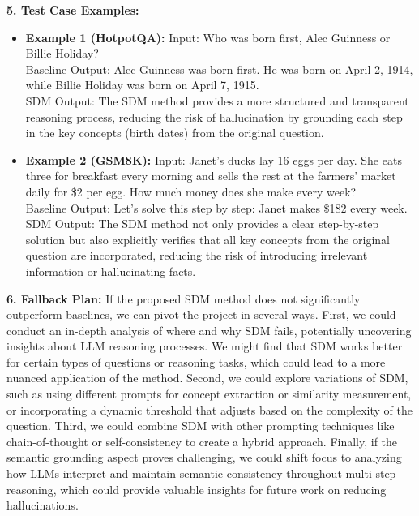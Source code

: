 \newpage

\begin{tcolorbox}[colback=blue!5!white,colframe=blue!75!black,title=\textbf{Semantic Divergence Minimization: Reducing Hallucinations in Large Language Models
through Iterative Concept Grounding (Part 3)}]
\small{
\textbf{5. Test Case Examples:}
\begin{itemize}
    \item \textbf{Example 1 (HotpotQA):} Input: Who was born first, Alec Guinness or Billie Holiday? \\
    Baseline Output: Alec Guinness was born first. He was born on April 2, 1914, while Billie Holiday was born on April 7, 1915. \\
    SDM Output: The SDM method provides a more structured and transparent reasoning process, reducing the risk of hallucination by grounding each step in the key concepts (birth dates) from the original question.

    \item \textbf{Example 2 (GSM8K):} Input: Janet's ducks lay 16 eggs per day. She eats three for breakfast every morning and sells the rest at the farmers' market daily for \$2 per egg. How much money does she make every week? \\
    Baseline Output: Let's solve this step by step: Janet makes \$182 every week. \\
    SDM Output: The SDM method not only provides a clear step-by-step solution but also explicitly verifies that all key concepts from the original question are incorporated, reducing the risk of introducing irrelevant information or hallucinating facts.
\end{itemize}

\textbf{6. Fallback Plan:} If the proposed SDM method does not significantly outperform baselines, we can pivot the project in several ways. First, we could conduct an in-depth analysis of where and why SDM fails, potentially uncovering insights about LLM reasoning processes. We might find that SDM works better for certain types of questions or reasoning tasks, which could lead to a more nuanced application of the method. Second, we could explore variations of SDM, such as using different prompts for concept extraction or similarity measurement, or incorporating a dynamic threshold that adjusts based on the complexity of the question. Third, we could combine SDM with other prompting techniques like chain-of-thought or self-consistency to create a hybrid approach. Finally, if the semantic grounding aspect proves challenging, we could shift focus to analyzing how LLMs interpret and maintain semantic consistency throughout multi-step reasoning, which could provide valuable insights for future work on reducing hallucinations.
}
\end{tcolorbox}


